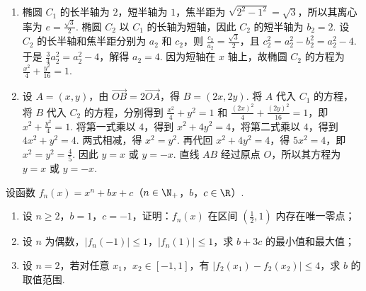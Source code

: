 \begin{solution}
\begin{enumerate}
\item 椭圆 \(C_1\) 的长半轴为 \(2\)，短半轴为 \(1\)，焦半距为 \(\sqrt{2^2-1^2}=\sqrt{3}\)，所以其离心率为 \(e=\frac{\sqrt{3}}{2}\). 椭圆 \(C_2\) 以 \(C_1\) 的长轴为短轴，因此 \(C_2\) 的短半轴为 \(b_2=2\). 设 \(C_2\) 的长半轴和焦半距分别为 \(a_2\) 和 \(c_2\)，则
\(\frac{c_2}{a_2}=\frac{\sqrt{3}}{2}\)，且 \(c_2^2=a_2^2-b_2^2=a_2^2-4\). 于是 \(\frac{3}{4}a_2^2=a_2^2-4\)，解得 \(a_2=4\). 因为短轴在 \(x\) 轴上，故椭圆 \(C_2\) 的方程为 \(\frac{x^2}{4}+\frac{y^2}{16}=1\).

\item 设 \(A=(x,y)\)，由 \(\overrightarrow{OB}=2\overrightarrow{OA}\)，得 \(B=(2x,2y)\). 将 \(A\) 代入 \(C_1\) 的方程，将 \(B\) 代入 \(C_2\) 的方程，分别得到 \(\frac{x^2}{4}+y^2=1\) 和 \(\frac{(2x)^2}{4}+\frac{(2y)^2}{16}=1\)，即 \(x^2+\frac{y^2}{4}=1\). 将第一式乘以 \(4\)，得到 \(x^2+4y^2=4\)，将第二式乘以 \(4\)，得到 \(4x^2+y^2=4\). 两式相减，得 \(x^2=y^2\). 再代回 \(x^2+4y^2=4\)，得 \(5x^2=4\)，即 \(x^2=y^2=\frac{4}{5}\). 因此 \(y=x\) 或 \(y=-x\). 直线 \(AB\) 经过原点 \(O\)，所以其方程为 \(y=x\) 或 \(y=-x\).
\end{enumerate}
\end{solution}

\begin{problem}
设函数 \(f_n(x) = x^n + bx + c\)（\(n \in \N_+\)，\(b\)，\(c \in \R\)）.

\begin{enumerate}
\item 设 \(n \geqslant 2\)，\(b = 1\)，\(c = -1\)，证明：\(f_n(x)\) 在区间 \(\left(\frac{1}{2}, 1\right)\) 内存在唯一零点；
\item 设 \(n\) 为偶数，\(|f_n(-1)| \leqslant 1\)，\(|f_n(1)| \leqslant 1\)，求 \(b + 3c\) 的最小值和最大值；
\item 设 \(n = 2\)，若对任意 \(x_1\)，\(x_2 \in [-1, 1]\)，有 \(|f_2(x_1) - f_2(x_2)| \leqslant 4\)，求 \(b\) 的取值范围.
\end{enumerate}
\end{problem}

